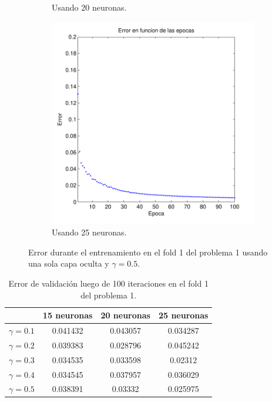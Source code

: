 \documentclass[informe.tex]{subfiles}
\begin{document}
\begin{figure}[H]
\begin{subfigure}[b]{0.32\textwidth}
                \caption{Usando 20 neuronas.}
                \label{fig:d1-f1-05-n20}
        \end{subfigure}
        \begin{subfigure}[b]{0.32\textwidth}
                \includegraphics[width=\textwidth]{graficos/error_fold1_25_binary_100_05.pdf}
                \caption{Usando 25 neuronas.}
                \label{fig:d1-f1-05-n25}
        \end{subfigure}
        
        \caption{Error durante el entrenamiento en el fold 1 del problema 1 usando una sola capa oculta y $\gamma=0.5$.}\label{fig:p1-f1-gamma05}
    \end{figure}    
    
    
    
    \begin{table}
      \begin{center}
	\begin{tabular}{|c|c|c|c|}
	\hline
	& 15 neuronas & 20 neuronas & 25 neuronas \\ 
	\hline
	$\gamma=0.1$ & 0.041432 & 0.043057 & 0.034287 \\
	\hline
	$\gamma=0.2$ & 0.039383 & 0.028796 & 0.045242 \\
	\hline
	$\gamma=0.3$ & 0.034535 & 0.033598 & 0.02312 \\
	\hline
	$\gamma=0.4$ & 0.034545 & 0.037957 & 0.036029 \\
	\hline     
	$\gamma=0.5$ & 0.038391 & 0.03332 & 0.025975 \\
	\hline      
	\end{tabular}
	\caption{Error de validación luego de 100 iteraciones en el fold 1 del problema 1.}
	\label{tab:error-d1-f1}
      \end{center}
    \end{table}
    
\end{document}
